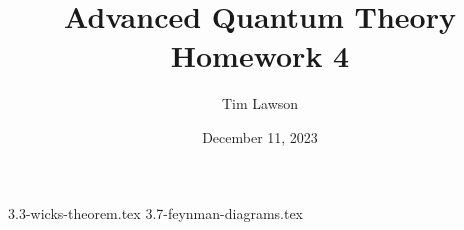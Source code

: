 \documentclass[a4paper]{extarticle}
\title{Advanced Quantum Theory\\
\large Homework 4}
\author{Tim Lawson}
\date{December 11, 2023}
\begin{document}
\maketitle

\setcounter{section}{3}
\setcounter{subsection}{2}
{3.3-wicks-theorem.tex}
\setcounter{subsection}{6}
{3.7-feynman-diagrams.tex}
\end{document}
